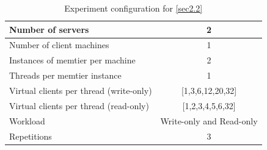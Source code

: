 \documentclass[11pt,a4paper]{article}
\begin{document}
\begin{center}
    \begin{table}
		\begin{tabular}{|l|c|}
			\hline Number of servers                        & 2                        \\ 
			\hline Number of client machines                & 1                        \\ 
			\hline Instances of memtier per machine         & 2                        \\ 
			\hline Threads per memtier instance             & 1                        \\
			\hline Virtual clients per thread (write-only)  & [1,3,6,12,20,32]         \\ 
			\hline Virtual clients per thread (read-only)   & [1,2,3,4,5,6,32]         \\ 
			\hline Workload                                 & Write-only and Read-only \\
			\hline Repetitions                              & 
			3                        \\ 
			\hline 
		\end{tabular}
		\caption{Experiment configuration for \autoref{sec2.2}} \label{exp2-2}
	\end{table}
\end{center}
\end{document}
